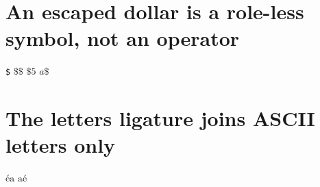 \documentclass{article}
\begin{document}
\section{An escaped dollar is a role-less symbol, not an operator}
\texttt{\meaning\$}
$\$\$$ $\$5$ $a\$$

\section{The letters ligature joins ASCII letters only}
$\mathrm{éa}$ $\mathrm{aé}$
\end{document}
